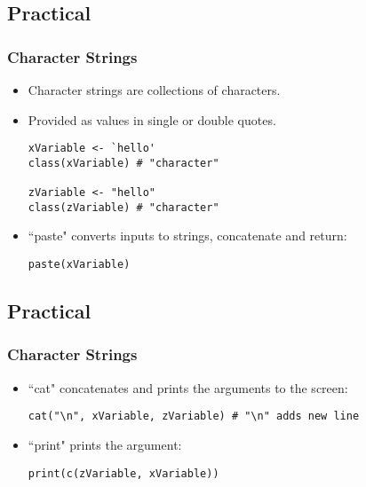 \documentclass[11pt]{beamer}
\begin{document}
\subsection{Practical}
\begin{frame}[fragile]
\frametitle{Character Strings}
\begin{itemize}
\item Character strings are collections of characters.
\vspace{0.1in}
\item Provided as values in single or double quotes.
\vspace{0.1in}
\begin{verbatim} 
xVariable <- `hello'
class(xVariable) # "character"

zVariable <- "hello"
class(zVariable) # "character"
\end{verbatim}
\vspace{0.1in}
\item ``paste" converts inputs to strings, concatenate and return:
\vspace{0.1in}
\begin{verbatim} 
paste(xVariable)
\end{verbatim}
\end{itemize}
\end{frame}



\subsection{Practical}
\begin{frame}[fragile]
\frametitle{Character Strings}
\begin{itemize}
\item ``cat" concatenates and prints the arguments to the screen:
\vspace{0.1in}
\begin{verbatim} 
cat("\n", xVariable, zVariable) # "\n" adds new line
\end{verbatim}
\vspace{0.1in}
\item ``print" prints the argument:
\begin{verbatim} 
print(c(zVariable, xVariable))
\end{verbatim}
\end{itemize}
\end{frame}
\end{document}
